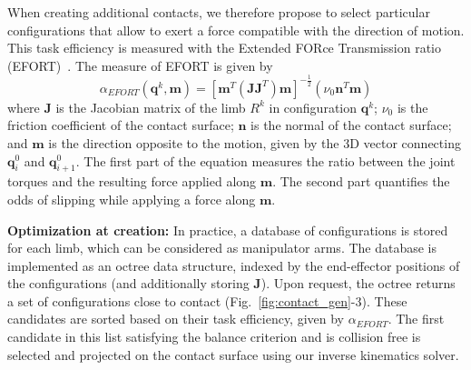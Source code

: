 When creating additional contacts, we therefore propose to select particular configurations that allow to exert a force compatible with the direction of motion. This task efficiency is measured  with the Extended FORce Transmission ratio (EFORT)~\cite{Tonneau2014}.
%
The measure of EFORT is given by
\begin{equation}
\alpha_{EFORT}(\mathbf{q}^k, \mathbf{m}) = [\mathbf{m}^{T}(\mathbf{J}\mathbf{J}^T)\mathbf{m}]^{-\frac{1}{2}} ( \nu_0 \mathbf{n}^T \mathbf{m})
\end{equation}
where $\mathbf{J}$ is the Jacobian matrix of the limb $R^k$ in configuration $\mathbf{q}^k$; $\nu_0$ is the friction coefficient of the contact surface; $\mathbf{n}$ is the normal of the contact surface; and $\mathbf{m}$ is the direction opposite to the motion,
given by the 3D vector connecting $\mathbf{q}_{i}^0$ and $\mathbf{q}_{i+1}^0$.
%
The first part of the equation measures the ratio between the joint  torques and the resulting force applied along $\mathbf{m}$. The second part quantifies the odds of slipping while applying a force along $\mathbf{m}$. 

\noindent\textbf{Optimization at creation:} In practice, a database of configurations is stored for each limb, which can be considered as manipulator arms. The database is implemented  as an octree data structure, indexed by the end-effector positions of the configurations (and additionally storing $\mathbf{J}$). 
Upon request, the octree returns a set of configurations close to contact (Fig.~\ref{fig:contact_gen}-3). These candidates are sorted based on their task efficiency, given by $\alpha_{EFORT}$. The first candidate in this list satisfying the balance criterion and is collision free is selected and projected on the contact surface using our inverse kinematics solver.






